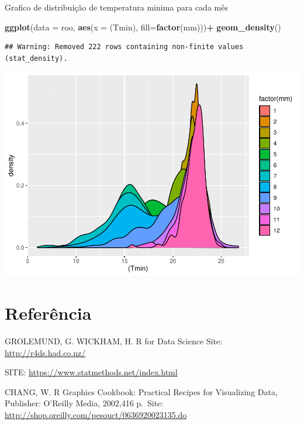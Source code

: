 \documentclass[]{book}
\newenvironment{Shaded}{\begin{snugshade}}{\end{snugshade}}
\newcommand{\DataTypeTok}[1]{\textcolor[rgb]{0.13,0.29,0.53}{#1}}
\newcommand{\KeywordTok}[1]{\textcolor[rgb]{0.13,0.29,0.53}{\textbf{#1}}}
\newcommand{\NormalTok}[1]{#1}
\newcommand{\OperatorTok}[1]{\textcolor[rgb]{0.81,0.36,0.00}{\textbf{#1}}}
\newcommand{\StringTok}[1]{\textcolor[rgb]{0.31,0.60,0.02}{#1}}
\begin{document}
Grafico de distribuição de temperatura minima para cada mês

\begin{Shaded}
\begin{Highlighting}[]
\KeywordTok{ggplot}\NormalTok{(}\DataTypeTok{data =}\NormalTok{ roo, }\KeywordTok{aes}\NormalTok{(}\DataTypeTok{x =}\NormalTok{ (Tmin), }\DataTypeTok{fill=}\KeywordTok{factor}\NormalTok{(mm)))}\OperatorTok{+}
\StringTok{  }\KeywordTok{geom_density}\NormalTok{() }
\end{Highlighting}
\end{Shaded}

\begin{verbatim}
## Warning: Removed 222 rows containing non-finite values (stat_density).
\end{verbatim}

\includegraphics{TudodoR_files/figure-latex/unnamed-chunk-243-1.pdf}

\hypertarget{referencia-3}{%
\chapter{Referência}\label{referencia-3}}

GROLEMUND, G. WICKHAM, H. R for Data Science Site: \url{http://r4ds.had.co.nz/}

SITE: \url{https://www.statmethods.net/index.html}

CHANG, W. R Graphics Cookbook: Practical Recipes for Visualizing Data, Publisher: O'Reilly Media, 2002,416 p.~Site: \url{http://shop.oreilly.com/pesouct/0636920023135.do}


\end{document}
